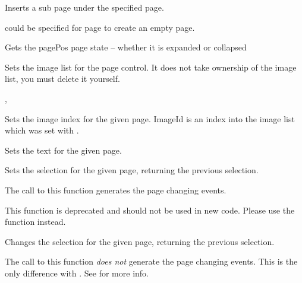Inserts a sub page under the specified page.

\NULL could be specified for page to create an empty page.


\label{wxtreebookisnodeexpanded}


Gets the pagePos page state -- whether it is expanded or collapsed



\label{wxtreebooksetimagelist}


Sets the image list for the page control. It does not take ownership of the image list, you must delete it yourself.


, 



\label{wxtreebooksetpageimage}


Sets the image index for the given page. ImageId is an index into the image list
which was set with .



\label{wxtreebooksetpagetext}


Sets the text for the given page.



\label{wxtreebooksetselection}


Sets the selection for the given page, returning the previous selection.

The call to this function generates the page changing events.

This function is deprecated and should not be used in new code. Please use the
 function instead.





\label{wxtreebookchangeselection}


Changes the selection for the given page, returning the previous selection.

The call to this function \emph{does not} generate the page changing events.
This is the only difference with .
See  for more info.


